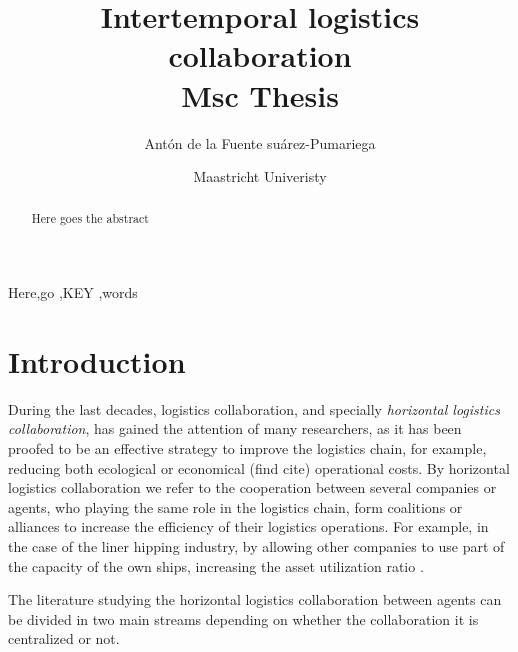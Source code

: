 \documentclass[review]{elsarticle}
\begin{document}
\begin{frontmatter}

\title{Intertemporal logistics collaboration \\[5pt]
                \normalsize{Msc Thesis}}

\author{Antón de la Fuente suárez-Pumariega}
\address{a.delafuentesuarez-pumariega@student.maastrichtuniverisry.nl }

\author{Maastricht Univeristy}



\begin{abstract}
Here goes the abstract
\end{abstract}

\begin{keyword}
Here\sep go \sep KEY \sep words
\end{keyword}

\end{frontmatter}


\section{Introduction}

During the last decades, logistics collaboration, and specially \emph{horizontal
logistics collaboration}, has gained the attention of many researchers, as it
has been proofed to be an effective strategy to improve the logistics chain, for
example, reducing both ecological \cite{BALLOT2010} or economical (find cite)
operational costs. By horizontal logistics collaboration we refer to the
cooperation between several companies or agents, who playing the same role in
the logistics chain, form coalitions or alliances to increase the efficiency of
their logistics operations. For example, in the case of the liner hipping
industry, by allowing other companies to use part of the capacity of the own
ships, increasing the asset utilization ratio \cite{AGARWAL2008175}.


The literature studying the horizontal logistics collaboration between agents
can be divided in two main streams depending on whether the collaboration it is
centralized or not. 
\end{document}
